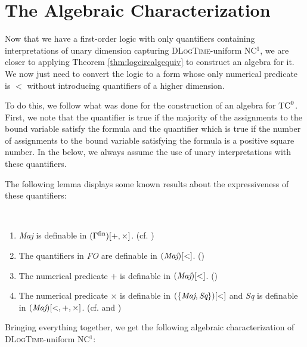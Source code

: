 \documentclass[a4paper,UKenglish,cleveref, autoref, thm-restate, anonymous]{lipics-v2021}
\begin{document}
\section{The Algebraic Characterization}\label{sec:alg}


Now that we have a first-order logic with only quantifiers containing interpretations of unary dimension capturing \textsc{DLogTime}-uniform NC${}^1$, we are closer to applying Theorem \ref{thm:logcircalgequiv} to construct an algebra for it. We now just need to convert the logic to a form whose only numerical predicate is $<$ without introducing quantifiers of a higher dimension.

To do this, we follow what was done for the construction of an algebra for $\mathrm{TC}^0$. First, we note that the quantifier  is true if the majority of the assignments to the bound variable satisfy the formula and the quantifier  which is true if the number of assignments to the bound variable satisfying the formula is a positive square number. In the below, we always assume the use of unary interpretations with these quantifiers.

The following lemma displays some known results about the expressiveness of these quantifiers:
\begin{lemma}\label{lem:superhelperalogtime}
    \,
    \begin{enumerate}[\ \ \ \ (i)]
        \item \emph{Maj} is definable in $(\Gamma^{\mathrm{fin}})[+,\times]$. (cf. \cite{barrington1990uniformity})
        \item The quantifiers in \emph{FO} are definable in $(\emph{Maj})[<]$. (\cite[Theorem 3.2]{lange2004some})
        \item The numerical predicate $+$ is definable in $(\emph{Maj})[<]$. (\cite[Theorem 4.1]{lange2004some})
        \item The numerical predicate $\times$ is definable in $(\{\emph{Maj}, \emph{Sq}\})[<]$ and \emph{Sq} is definable in $(\emph{Maj})[<,+,\times]$. (cf. \cite[Theorem 2.3.f]{schweikardt2002expressive} and \cite[Section 2.3]{krebs2007characterizing})
    \end{enumerate}
\end{lemma}

Bringing everything together, we get the following algebraic characterization of \textsc{DLogTime}-uniform NC${}^1$:
\end{document}
